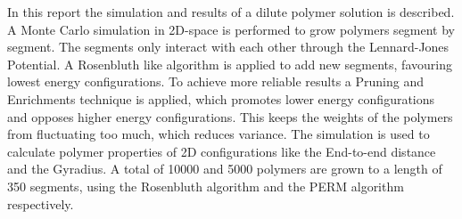 In this report the simulation and results of a dilute polymer solution is described.  A Monte Carlo simulation in 2D-space is performed to grow polymers segment by segment. The segments only interact with each other through the Lennard-Jones Potential. A Rosenbluth like algorithm is applied to add new segments, favouring lowest energy configurations. To achieve more reliable results a Pruning and Enrichments technique is applied, which promotes lower energy configurations and opposes higher energy configurations. This keeps the weights of the polymers from fluctuating too much, which reduces variance. The simulation is used to calculate polymer properties of 2D configurations like the End-to-end distance and the Gyradius. A total of 10000 and 5000 polymers are grown to a length of 350 segments, using the Rosenbluth algorithm and the PERM algorithm respectively.